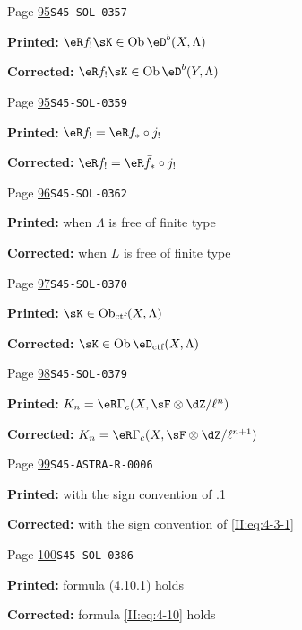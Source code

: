 \documentclass[oneside]{book}
\DeclareMathOperator{\ob}{Ob}
\theoremstyle{sga-source}
\theoremstyle{sga-source-dash}
\theoremstyle{sga-source-dotdash}
\theoremstyle{sga-source-number-note-dash}
\theoremstyle{sga-source-note-number-dotdash}
\theoremstyle{sga-source-example-dotdash}
\theoremstyle{sga-source-inline-number}
\theoremstyle{sga-source-bare-number}
\theoremstyle{sga-source}
\begin{document}
\begin{description}
\smallskip
\item[\hypertarget{apparatus:EN-0036}{36}] Page \hyperlink{printpage:en:95}{95}\quad\texttt{S45-SOL-0357}
\par\noindent\textbf{Printed:} $\eR f_!\sK\in \ob \eD^b(X,\Lambda)$
\par\noindent\textbf{Corrected:} $\eR f_!\sK\in \ob \eD^b(Y,\Lambda)$
\smallskip
\item[\hypertarget{apparatus:EN-0037}{37}] Page \hyperlink{printpage:en:95}{95}\quad\texttt{S45-SOL-0359}
\par\noindent\textbf{Printed:} $\eR f_! = \eR f_*\circ j_!$
\par\noindent\textbf{Corrected:} $\eR f_! = \eR \bar f_*\circ j_!$
\smallskip
\item[\hypertarget{apparatus:EN-0038}{38}] Page \hyperlink{printpage:en:96}{96}\quad\texttt{S45-SOL-0362}
\par\noindent\textbf{Printed:} when $\Lambda$ is free of finite type
\par\noindent\textbf{Corrected:} when $L$ is free of finite type
\smallskip
\item[\hypertarget{apparatus:EN-0039}{39}] Page \hyperlink{printpage:en:97}{97}\quad\texttt{S45-SOL-0370}
\par\noindent\textbf{Printed:} \(\sK\in\ob_{\text{ctf}}(X,\Lambda)\)
\par\noindent\textbf{Corrected:} \(\sK\in\ob\eD_\text{ctf}(X,\Lambda)\)
\smallskip
\item[\hypertarget{apparatus:EN-0040}{40}] Page \hyperlink{printpage:en:98}{98}\quad\texttt{S45-SOL-0379}
\par\noindent\textbf{Printed:} $K_n=\eR\Gamma_c(X,\sF\otimes\dZ/\ell^n)$
\par\noindent\textbf{Corrected:} $K_n=\eR\Gamma_c(X,\sF\otimes\dZ/\ell^{n+1})$
\smallskip
\item[\hypertarget{apparatus:EN-0041}{41}] Page \hyperlink{printpage:en:99}{99}\quad\texttt{S45-ASTRA-R-0006}
\par\noindent\textbf{Printed:} with the sign convention of .1
\par\noindent\textbf{Corrected:} with the sign convention of \ref{II:eq:4-3-1}
\smallskip
\item[\hypertarget{apparatus:EN-0042}{42}] Page \hyperlink{printpage:en:100}{100}\quad\texttt{S45-SOL-0386}
\par\noindent\textbf{Printed:} formula (4.10.1) holds
\par\noindent\textbf{Corrected:} formula \eqref{II:eq:4-10} holds

\end{description}
\end{document}
